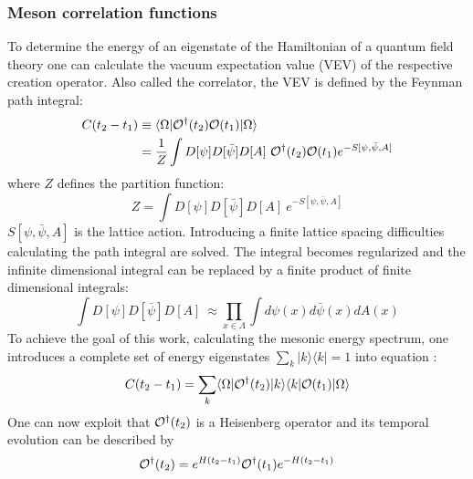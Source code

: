    \subsubsection{Meson correlation functions}
        To determine the energy of an eigenstate of the Hamiltonian of a quantum field theory one can calculate the vacuum expectation value (VEV) of the respective creation operator. Also called the correlator, the VEV is defined by the Feynman path integral:
        \begin{equation}\label{VEV}
            \begin{aligned}
                C(t_2 - t_1) &\equiv \langle\Omega|\Operator^\dagger(t_2)\Operator(t_1)|\Omega\rangle \\
                &= \frac{1}{Z}\int D[\psi]D[\bar{\psi}]D[A]\ \Operator^\dagger(t_2)\Operator(t_1)e^{-S[\psi, \bar{\psi}, A]}
            \end{aligned}
        \end{equation}
        where $Z$ defines the partition function:
        \begin{equation}\label{partition_function}
            Z = \int D[\psi]D[\bar{\psi}]D[A]\ e^{-S[\psi, \bar{\psi}, A]}
        \end{equation}
        $S[\psi, \bar{\psi}, A]$ is the lattice action. Introducing a finite lattice spacing difficulties calculating the path integral are solved. The integral becomes regularized and the infinite dimensional integral can be replaced by a finite product of finite dimensional integrals:
        \begin{equation}
            \int D[\psi]D[\bar{\psi}]D[A]\ \approx \prod_{x \in \Lambda}\int d\psi(x)d\bar{\psi}(x)dA(x)
        \end{equation}
        To achieve the goal of this work, calculating the mesonic energy spectrum, one introduces a complete set of energy eigenstates $\sum_k |k\rangle\langle k| = 1$ into equation :
        \begin{equation}\label{correlation_with_eigenstates}
            C(t_2 - t_1) = \sum_k \langle\Omega|\mathcal{O}^\dagger(t_2) |k\rangle\langle k| \mathcal{O}(t_1)|\Omega\rangle
        \end{equation}
        One can now exploit that $\mathcal{O}^\dagger(t_2)$ is a Heisenberg operator and its temporal evolution can be described by
        \begin{equation}
            \mathcal{O}^\dagger(t_2) = e^{H(t_2 - t_1)}\mathcal{O}^\dagger(t_1)e^{-H(t_2 - t_1)}
        \end{equation}
